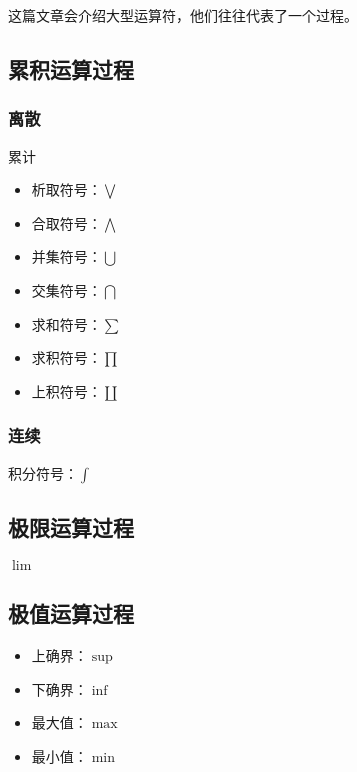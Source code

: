 
\begin{issues}
\issueDraft
\end{issues}

这篇文章会介绍大型运算符，他们往往代表了一个过程。

\subsection{累积运算过程}
\subsubsection{离散}
累计
\begin{itemize}
\item 析取符号：$\bigvee$
\item 合取符号：$\bigwedge$
\item 并集符号：$\bigcup$
\item 交集符号：$\bigcap$
\item 求和符号：$\sum$
\item 求积符号：$\prod$
\item 上积符号：$\coprod$
\end{itemize}
\subsubsection{连续}
积分符号：$\int$
\subsection{极限运算过程}

$\lim$

\subsection{极值运算过程}

\begin{itemize}
\item 上确界：$\sup$
\item 下确界：$\inf$
\item 最大值：$\max$
\item 最小值：$\min$
\end{itemize}
